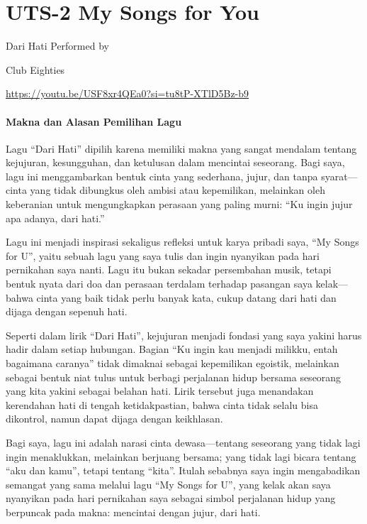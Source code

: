 \documentclass[
  letterpaper,
  DIV=11,
  numbers=noendperiod]{scrreprt}
\begin{document}

\chapter{UTS-2 My Songs for You}\label{uts-2-my-songs-for-you}

Dari Hati Performed by

Club Eighties

\url{https://youtu.be/USF8xr4QEa0?si=tu8tP-XTlD5Bz-b9}

\subsubsection{Makna dan Alasan Pemilihan
Lagu}\label{makna-dan-alasan-pemilihan-lagu}

Lagu ``Dari Hati'' dipilih karena memiliki makna yang sangat mendalam
tentang kejujuran, kesungguhan, dan ketulusan dalam mencintai seseorang.
Bagi saya, lagu ini menggambarkan bentuk cinta yang sederhana, jujur,
dan tanpa syarat---cinta yang tidak dibungkus oleh ambisi atau
kepemilikan, melainkan oleh keberanian untuk mengungkapkan perasaan yang
paling murni: ``Ku ingin jujur apa adanya, dari hati.''

Lagu ini menjadi inspirasi sekaligus refleksi untuk karya pribadi saya,
``My Songs for U'', yaitu sebuah lagu yang saya tulis dan ingin
nyanyikan pada hari pernikahan saya nanti. Lagu itu bukan sekadar
persembahan musik, tetapi bentuk nyata dari doa dan perasaan terdalam
terhadap pasangan saya kelak---bahwa cinta yang baik tidak perlu banyak
kata, cukup datang dari hati dan dijaga dengan sepenuh hati.

Seperti dalam lirik ``Dari Hati'', kejujuran menjadi fondasi yang saya
yakini harus hadir dalam setiap hubungan. Bagian ``Ku ingin kau menjadi
milikku, entah bagaimana caranya'' tidak dimaknai sebagai kepemilikan
egoistik, melainkan sebagai bentuk niat tulus untuk berbagi perjalanan
hidup bersama seseorang yang kita yakini sebagai belahan hati. Lirik
tersebut juga menandakan kerendahan hati di tengah ketidakpastian, bahwa
cinta tidak selalu bisa dikontrol, namun dapat dijaga dengan keikhlasan.

Bagi saya, lagu ini adalah narasi cinta dewasa---tentang seseorang yang
tidak lagi ingin menaklukkan, melainkan berjuang bersama; yang tidak
lagi bicara tentang ``aku dan kamu'', tetapi tentang ``kita''. Itulah
sebabnya saya ingin mengabadikan semangat yang sama melalui lagu ``My
Songs for U'', yang kelak akan saya nyanyikan pada hari pernikahan saya
sebagai simbol perjalanan hidup yang berpuncak pada makna: mencintai
dengan jujur, dari hati.
\end{document}

